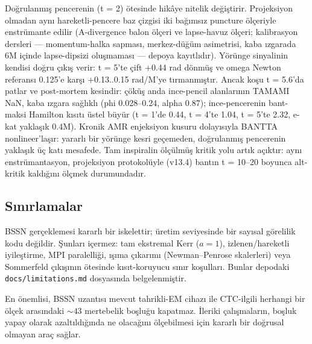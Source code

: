 Doğrulanmış pencerenin (t = 2) ötesinde hikâye nitelik değiştirir.
Projeksiyon olmadan aynı hareketli-pencere baz çizgisi iki bağımsız
puncture ölçeriyle enstrümante edilir (A-divergence balon ölçeri ve
lapse-havuz ölçeri; kalibrasyon dersleri --- momentum-halka sapması,
merkez-düğüm asimetrisi, kaba ızgarada 6M içinde lapse-dipsizi
oluşmaması --- depoya kayıtlıdır). Yörünge sinyalinin kendisi doğru
çıkış verir: t = 5'te çift +0.44 rad dönmüş ve omega Newton
referansı 0.125'e karşı +0.13..0.15 rad/M'ye tırmanmıştır. Ancak
koşu t = 5.6'da patlar ve post-mortem kesindir: çöküş anda
ince-pencil alanlarının TAMAMI NaN, kaba ızgara sağlıklı
(phi 0.028--0.24, alpha 0.87); ince-pencerenin bant-maksi
Hamilton kısıtı üstel büyür (t = 1'de 0.44, t = 4'te 1.04,
t = 5'te 2.32, e-kat yaklaşık 0.4M). Kronik AMR enjeksiyon kusuru
dolayısıyla BANTTA nonlineer'laşır: yararlı bir yörünge kesri
geçemeden, doğrulanmış pencerenin yaklaşık üç katı mesafede. Tam
inspiralin ölçülmüş kritik yolu artık açıktır: aynı enstrümantasyon,
projeksiyon protokolüyle (v13.4) bantın t = 10--20 boyunca
alt-kritik kaldığını ölçmek durumundadır.

\subsection{Sınırlamalar}

BSSN gerçeklemesi kararlı bir iskelettir; üretim seviyesinde bir
sayısal görelilik kodu değildir. Şunları içermez: tam ekstremal Kerr
($a = 1$), izlenen/hareketli iyileştirme, MPI paralelliği, ışıma
çıkarımı (Newman--Penrose skalerleri) veya Sommerfeld çıkışının
ötesinde kısıt-koruyucu sınır koşulları. Bunlar depodaki
\texttt{docs/limitations.md} dosyasında belgelenmiştir.

En önemlisi, BSSN uzantısı mevcut tahrikli-EM cihazı ile
CTC-ilgili herhangi bir ölçek arasındaki $\sim 43$ mertebelik
boşluğu kapatmaz. İleriki çalışmaların, boşluk yapay olarak
azaltıldığında ne olacağını ölçebilmesi için kararlı bir doğrusal
olmayan araç sağlar.

